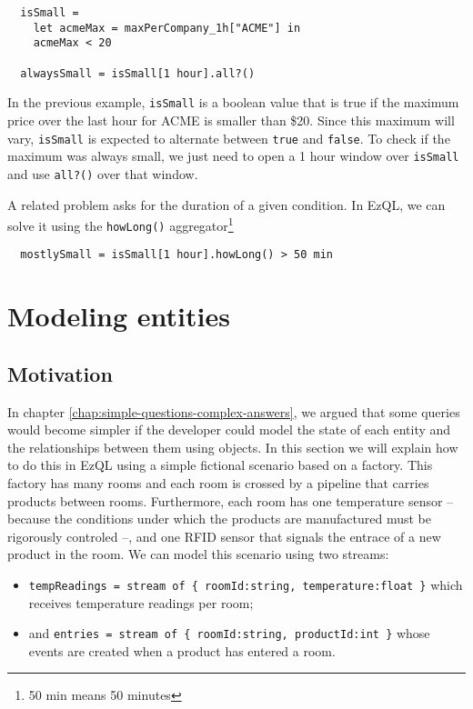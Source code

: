 \documentclass[a4,11pt]{report}
\begin{document}
\begin{lstlisting}
  isSmall =
    let acmeMax = maxPerCompany_1h["ACME"] in
    acmeMax < 20

  alwaysSmall = isSmall[1 hour].all?()
\end{lstlisting}

In the previous example, \verb=isSmall= is a boolean value that is
true if the maximum price over the last hour for ACME is smaller than
\$20. Since this maximum will vary, \verb=isSmall= is expected to
alternate between \verb=true= and \verb=false=. To check if the
maximum was always small, we just need to open a 1 hour window over
\verb=isSmall= and use \verb=all?()= over that window.

A related problem asks for the duration of a given condition. In EzQL,
we can solve it using the \verb=howLong()= aggregator\footnote{50 min
  means 50 minutes}

\begin{lstlisting}
  mostlySmall = isSmall[1 hour].howLong() > 50 min
\end{lstlisting}

\section{Modeling entities}

\label{sec:entities}

\subsection{Motivation}

In chapter \ref{chap:simple-questions-complex-answers}, we argued that
some queries would become simpler if the developer could model the
state of each entity and the relationships between them using
objects. In this section we will explain how to do this in EzQL using
a simple fictional scenario based on a factory. This factory has many
rooms and each room is crossed by a pipeline that carries products
between rooms. Furthermore, each room has one temperature sensor --
because the conditions under which the products are manufactured must
be rigorously controled --, and one RFID sensor that signals the
entrace of a new product in the room. We can model this scenario using
two streams:

\begin{itemize}
\item \verb!tempReadings = stream of { roomId:string, temperature:float }! which receives
  temperature readings per room;
\item and \verb!entries = stream of { roomId:string, productId:int }! whose events are
  created when a product has entered a room.
\end{itemize}
\end{document}
